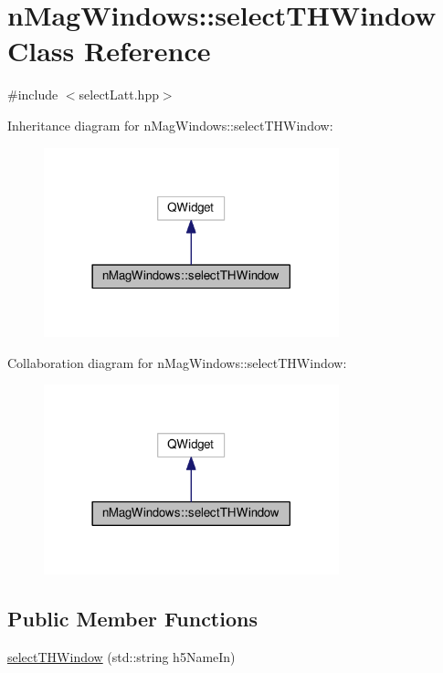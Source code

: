 \hypertarget{classnMagWindows_1_1selectTHWindow}{}\section{n\+Mag\+Windows\+:\+:select\+T\+H\+Window Class Reference}
\label{classnMagWindows_1_1selectTHWindow}


{\ttfamily \#include $<$select\+Latt.\+hpp$>$}



Inheritance diagram for n\+Mag\+Windows\+:\+:select\+T\+H\+Window\+:\nopagebreak
\begin{figure}[H]
\begin{center}
\leavevmode
\includegraphics[width=242pt]{d7/dd6/classnMagWindows_1_1selectTHWindow__inherit__graph}
\end{center}
\end{figure}


Collaboration diagram for n\+Mag\+Windows\+:\+:select\+T\+H\+Window\+:\nopagebreak
\begin{figure}[H]
\begin{center}
\leavevmode
\includegraphics[width=242pt]{df/df2/classnMagWindows_1_1selectTHWindow__coll__graph}
\end{center}
\end{figure}
\subsection*{Public Member Functions}
\begin{DoxyCompactItemize}
\item 
\hyperlink{classnMagWindows_1_1selectTHWindow_a57ec8a7a07a4b37031738674cb3bdb85}{select\+T\+H\+Window} (std\+::string h5\+Name\+In)
\end{DoxyCompactItemize}


